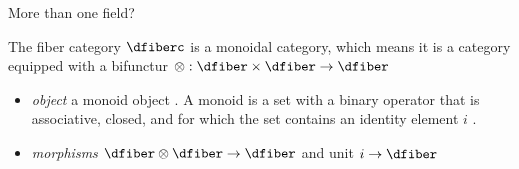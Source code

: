 \documentclass[xcolor={dvipsnames}, handout]{beamer}
\begin{document}
\begin{frame}{More than one field?}
    \begin{block}{} 
        \label{def:category:F} The fiber category $\mathcal{\dfiberc}$ is a monoidal category\cite{milewskiCategoryTheoryProgrammers}, which means it is a category equipped with a bifunctur $\otimes: \mathcal{\dfiber} \times \mathcal{\dfiber} \rightarrow \mathcal{\dfiber}$
        \begin{itemize}
          \item \textit{object} a monoid object \dfiber. A monoid is a set with a binary operator that is associative, closed, and for which the set contains an identity element $i$ \cite{nlab:monoid}.
          \item \textit{morphisms} $\dfiber \otimes \dfiber \rightarrow \dfiber$ and unit $i \rightarrow \dfiber$
        \end{itemize}
    \end{block}
\end{frame}
\end{document}

